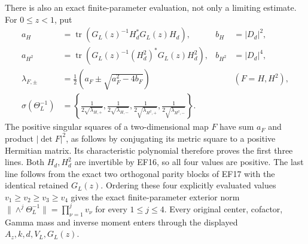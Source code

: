 \documentclass[11pt]{article}
\begin{document}
There is also an exact finite-parameter evaluation,
not only a limiting estimate. For $0\le z<1$, put
\begin{equation}
\begin{aligned}
 a_H&=\operatorname{tr}(G_L(z)^{-1}H_d^*G_L(z)H_d),&
 b_H&=|D_d|^2,\\
 a_{H^2}&=\operatorname{tr}(G_L(z)^{-1}(H_d^2)^*G_L(z)H_d^2),&
 b_{H^2}&=|D_d|^4,\\
 \lambda_{F,\pm}&=\tfrac12(a_F\pm\sqrt{a_F^2-4b_F})
       &&(F=H,H^2),\\
 \sigma(\Theta_L^{-1})&=
 \left\{\frac1{2\sqrt{\lambda_{H,+}}},
 \frac1{2\sqrt{\lambda_{H,-}}},
 \frac1{2\sqrt{\lambda_{H^2,+}}},
 \frac1{2\sqrt{\lambda_{H^2,-}}}\right\}.
\end{aligned}\tag{EF24}
\end{equation}
The positive singular squares of a two-dimensional
map $F$ have sum $a_F$ and product $|\det F|^2$,
as follows by conjugating its metric square to a
positive Hermitian matrix. Its characteristic
polynomial therefore proves the first three lines.
Both $H_d,H_d^2$ are invertible by EF16, so all
four values are positive. The last line follows
from the exact two orthogonal parity blocks of
EF17 with the identical retained $G_L(z)$.
Ordering these four explicitly evaluated values
$v_1\ge v_2\ge v_3\ge v_4$ gives the exact
finite-parameter exterior norm
$\|\wedge^j\Theta_L^{-1}\|=\prod_{\nu=1}^jv_\nu$
for every $1\le j\le4$. Every original center,
cofactor, Gamma mass and inverse moment enters
through the displayed $A_z,k,d,V_L,G_L(z)$.
\end{document}
